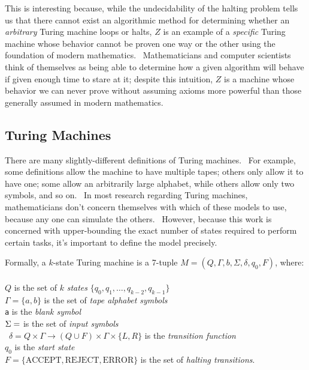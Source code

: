 \documentclass[11pt]{article}
\begin{document}
This is interesting because, while the undecidability of the halting problem tells us that there cannot exist an algorithmic method for determining whether an \emph{arbitrary} Turing machine loops or halts, $Z$ is an example of a \emph{specific} Turing machine whose behavior cannot be proven one way or the other using the foundation of modern mathematics. \ Mathematicians and computer scientists think of themselves as being able to determine how a given algorithm will behave if given enough time to stare at it; despite this intuition, $Z$ is a machine whose behavior we can never prove without assuming axioms more powerful than those generally assumed in modern mathematics.

\subsection{Turing Machines \label{sec:tm}}

There are many slightly-different definitions of Turing machines. \ For example, some definitions allow the machine to have multiple tapes; others only allow it to have one; some allow an arbitrarily large alphabet, while others allow only two symbols, and so on. \ In most research regarding Turing machines, mathematicians don't concern themselves with which of these models to use, because any one can simulate the others. \ However, because this work is concerned with upper-bounding the exact number of states required to perform certain tasks, it's important to define the model precisely.

Formally, a $k$-state Turing machine is a 7-tuple $M = (Q, \Gamma, b, \Sigma, \delta, q_0, F)$, where: \\ \\
$Q$ is the set of $k$ \emph{states} $\{q_0, q_1, \dots, q_{k-2}, q_{k-1}\}$ \\
$\Gamma = \{a, b\}$ is the set of \emph{tape alphabet symbols} \\
\texttt{a} is the \emph{blank symbol} \\
$\Sigma = \empty$ is the set of \emph{input symbols} \\\
$\delta = Q \times \Gamma \rightarrow (Q \cup F) \times \Gamma \times \{L, R\}$ is the \emph{transition function} \\
$q_0$ is the \emph{start state} \\
$F = \{\textrm{ACCEPT}, \textrm{REJECT}, \textrm{ERROR}\}$ is the set of \emph{halting transitions}. \\
\end{document}
